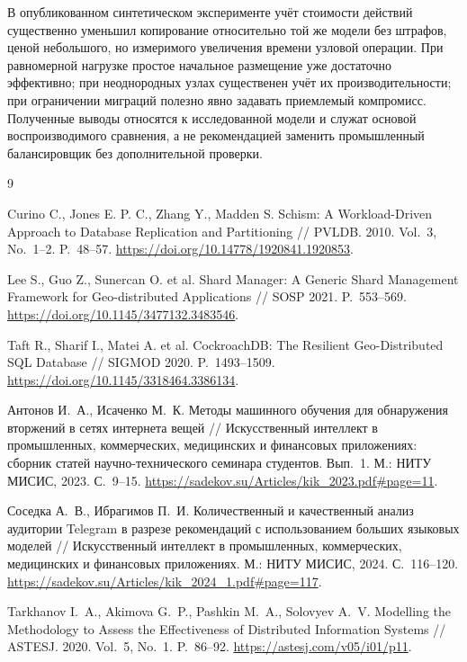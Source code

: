 \documentclass{misisarticle}
\begin{document}
В опубликованном синтетическом эксперименте учёт стоимости действий существенно уменьшил копирование относительно той же модели без штрафов, ценой небольшого, но измеримого увеличения времени узловой операции. При равномерной нагрузке простое начальное размещение уже достаточно эффективно; при неоднородных узлах существенен учёт их производительности; при ограничении миграций полезно явно задавать приемлемый компромисс. Полученные выводы относятся к исследованной модели и служат основой воспроизводимого сравнения, а не рекомендацией заменить промышленный балансировщик без дополнительной проверки.

\begin{thebibliography}{9}

Curino C., Jones E. P. C., Zhang Y., Madden S.
Schism: A Workload-Driven Approach to Database Replication and Partitioning //
PVLDB. 2010. Vol.~3, No.~1--2. P.~48--57.
\url{https://doi.org/10.14778/1920841.1920853}.

Lee S., Guo Z., Sunercan O. et al.
Shard Manager: A Generic Shard Management Framework for Geo-distributed Applications //
SOSP 2021. P.~553--569.
\url{https://doi.org/10.1145/3477132.3483546}.

Taft R., Sharif I., Matei A. et al.
CockroachDB: The Resilient Geo-Distributed SQL Database //
SIGMOD 2020. P.~1493--1509.
\url{https://doi.org/10.1145/3318464.3386134}.

Антонов И.~А., Исаченко М.~К.
Методы машинного обучения для обнаружения вторжений в сетях интернета вещей //
Искусственный интеллект в промышленных, коммерческих, медицинских и финансовых приложениях:
сборник статей научно-технического семинара студентов.
Вып.~1. М.: НИТУ МИСИС, 2023. С.~9--15.
\url{https://sadekov.su/Articles/kik_2023.pdf#page=11}.

Соседка А.~В., Ибрагимов П.~И.
Количественный и качественный анализ аудитории Telegram в разрезе рекомендаций с использованием больших языковых моделей //
Искусственный интеллект в промышленных, коммерческих, медицинских и финансовых приложениях.
М.: НИТУ МИСИС, 2024. С.~116--120.
\url{https://sadekov.su/Articles/kik_2024_1.pdf#page=117}.

Tarkhanov I.~A., Akimova G.~P., Pashkin M.~A., Solovyev A.~V.
Modelling the Methodology to Assess the Effectiveness of Distributed Information Systems //
ASTESJ. 2020. Vol.~5, No.~1. P.~86--92.
\url{https://astesj.com/v05/i01/p11}.

\end{thebibliography}
\end{document}
